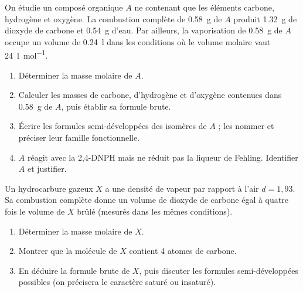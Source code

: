 
On étudie un composé organique $A$ ne contenant que les éléments carbone, hydrogène
et oxygène. La combustion complète de \SI{0.58}{\gram} de $A$ produit
\SI{1.32}{\gram} de dioxyde de carbone et \SI{0.54}{\gram} d'eau. Par ailleurs, la
vaporisation de \SI{0.58}{\gram} de $A$ occupe un volume de \SI{0.24}{\litre} dans
les conditions où le volume molaire vaut \SI{24}{\litre\per\mol}.
\begin{enumerate}[label=\arabic*)]
\item Déterminer la masse molaire de $A$.
\item Calculer les masses de carbone, d'hydrogène et d'oxygène contenues dans
\SI{0.58}{\gram} de $A$, puis établir sa formule brute.
\item Écrire les formules semi-développées des isomères de $A$ ; les nommer et
préciser leur famille fonctionnelle.
\item $A$ réagit avec la 2,4-DNPH mais ne réduit pas la liqueur de Fehling.
Identifier $A$ et justifier.
\end{enumerate}

Un hydrocarbure gazeux $X$ a une densité de vapeur par rapport à l'air $d = 1{,}93$.
Sa combustion complète donne un volume de dioxyde de carbone égal à quatre fois le
volume de $X$ brûlé (mesurés dans les mêmes conditions).
\begin{enumerate}[label=\arabic*)]
\item Déterminer la masse molaire de $X$.
\item Montrer que la molécule de $X$ contient 4 atomes de carbone.
\item En déduire la formule brute de $X$, puis discuter les formules
semi-développées possibles (on précisera le caractère saturé ou insaturé).
\end{enumerate}
